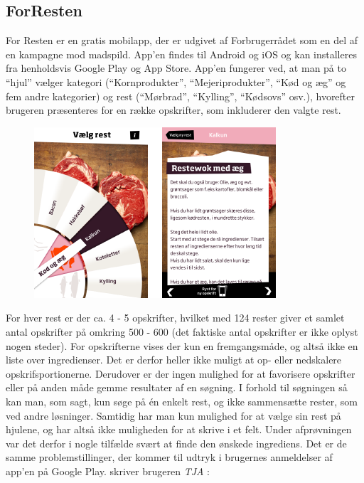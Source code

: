 \subsection{ForResten}
\label{subsec:forresten}

For Resten er en gratis mobilapp, der er udgivet af Forbrugerrådet som en del af en kampagne mod madspild. App’en findes til Android og iOS og kan installeres fra henholdsvis Google Play og App Store. App’en fungerer ved, at man på to ``hjul'' vælger kategori (``Kornprodukter'', ``Mejeriprodukter'', ``Kød og æg'' og fem andre kategorier) og rest (\fx ``Mørbrad'', ``Kylling'', ``Kødsovs'' osv.), hvorefter brugeren præsenteres for en række opskrifter, som inkluderer den valgte rest.

\begin{figure}[H]
\centering
\includegraphics[scale=0.7]{billeder/forbilleder/forresten.png}
\label{fig:forresten}
\end{figure}

For hver rest er der ca. 4 - 5 opskrifter, hvilket med 124 rester giver et samlet antal opskrifter på omkring 500 - 600 (det faktiske antal opskrifter er ikke oplyst nogen steder). For opskrifterne vises der kun en fremgangsmåde, og altså ikke en liste over ingredienser. Det er derfor heller ikke muligt at op- eller nedskalere opskrifsportionerne. Derudover er der ingen mulighed for at favorisere opskrifter eller på anden måde gemme resultater af en søgning. I forhold til søgningen så kan man, som sagt, kun søge på én enkelt rest, og ikke sammensætte rester, som ved andre løsninger. Samtidig har man kun mulighed for at vælge sin rest på hjulene, og har altså ikke muligheden for at skrive i et felt. Under afprøvningen var det derfor i nogle tilfælde svært at finde den ønskede ingrediens. Det er de samme problemstillinger, der kommer til udtryk i brugernes anmeldelser af app’en på Google Play. \Fx skriver brugeren \textit{TJA} \cite{tja}:

